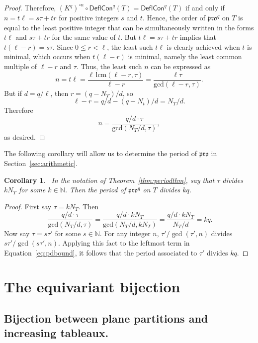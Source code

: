 \documentclass[12pt]{amsart}
\newtheorem{corollary}[theorem]{Corollary}
\theoremstyle{definition}
\theoremstyle{remark}
\numberwithin{equation}{section}
\newcommand{\pro}{\mathfrak{pro}}
\newcommand{\compress}{\ensuremath{\mathsf{DeflCon}}}
\begin{document}
\begin{proof}
Therefore, $(K^q)^{\circ n}  \circ \compress^q(T) = \compress^q(T)$ if and only if $n = t \ell = s \tau + t  r$ for positive integers $s$ and $t$. Hence, the order of $\pro^q$ on $T$ is equal to the least positive integer that can be simultaneously written in the forms $t \ell$ and $s \tau + t r$ for the same value of $t$. But $t \ell = s\tau + tr$ implies that $t(\ell-r) = s\tau$. Since $0 \leq r < \ell$, the least such $t \ell$ is clearly achieved when $t$ is minimal, which occurs when $t(\ell-r)$ is minimal, namely the least common multiple of $\ell-r$ and $\tau$. Thus, the least such $n$ can be expressed as 
\begin{equation}\label{eq:period}
n = t \ell = \frac{\ell \, \text{lcm}(\ell-r,\tau)}{\ell-r} = \frac{\ell \tau}{\text{gcd}(\ell-r,\tau)}.
\end{equation}
But if $d = q/\ell$, then $r = (q-N_T)/d$, so \[ \ell - r = q/d - (q-N_t)/d = N_T/d.\]
Therefore
\[ n = \frac{q/d \cdot \tau}{\text{gcd}(N_T/d,\tau)}, \]
as desired. 
\end{proof}

The following corollary will allow us to determine the period of $\pro$ in Section~\ref{sec:arithmetic}. 
\\
\begin{corollary}~\label{corr:pdbound}
In the notation of Theorem~\ref{thm:periodthm}, say that $\tau$ divides $k N_T$ for some $k \in \mathbb{N}$. Then the period of $\pro^q$ on $T$ divides $k q$. 
\end{corollary} 
\begin{proof}
First say $\tau = k N_T$. Then
\begin{equation}~\label{eq:pdbound} \frac{q/d \cdot \tau}{\text{gcd}(N_T/d,\tau)} = \frac{q/d \cdot k N_T}{\text{gcd}(N_T/d,k N_T)} = \frac{q/d \cdot k N_T}{N_T/d} = kq. 
\end{equation}
Now say $\tau = s \tau'$ for some $s \in \mathbb{N}$. For any integer $n$, $\tau'/\gcd(\tau',n)$ divides $s \tau'/\gcd(s \tau',n)$. Applying this fact to the leftmost term in Equation~\ref{eq:pdbound}, it follows that the period associated to $\tau'$ divides $k q$. 


\end{proof}
\section{The equivariant bijection}\label{sec:equivariant}
\subsection{Bijection between plane partitions and increasing tableaux.} 
\end{document}
